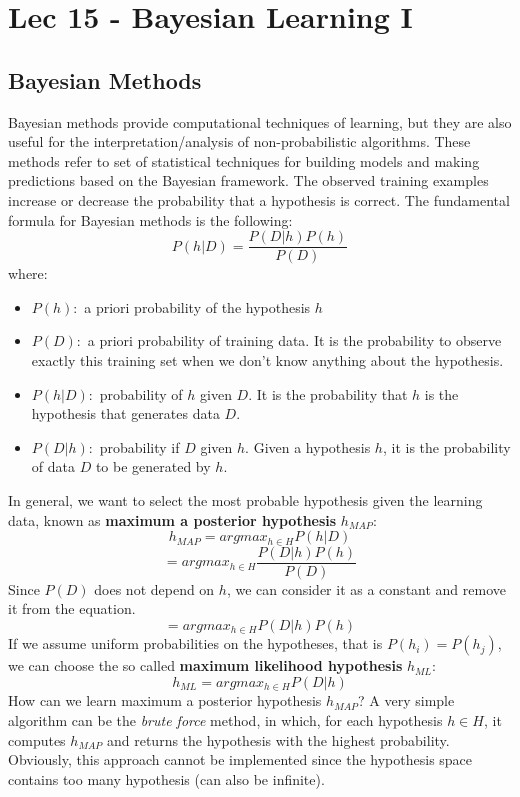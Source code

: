 \chapter{Lec 15 - Bayesian Learning I}

\section{Bayesian Methods}
Bayesian methods provide computational techniques of learning, but they are also useful for the interpretation/analysis of non-probabilistic algorithms.\newline\newline
These methods refer to set of statistical techniques for building models and making predictions based on the Bayesian framework. The observed training examples increase or decrease the probability that a hypothesis is correct.\newline\newline
The fundamental formula for Bayesian methods is the following:
\[P(h|D) = \frac{P(D|h)P(h)}{P(D)}\]
where:
\begin{itemize}
    \item $P(h):$ a priori probability of the hypothesis $h$
    \item $P(D):$ a priori probability of training data. It is the probability to observe exactly this training set when we don't know anything about the hypothesis.
    \item $P(h|D):$ probability of $h$ given $D$. It is the probability that $h$ is the hypothesis that generates data $D$.
    \item $P(D|h):$ probability if $D$ given $h$. Given a hypothesis $h$, it is the probability of data $D$ to be generated by $h$.
\end{itemize}
In general, we want to select the most probable hypothesis given the learning data, known as \textbf{maximum a posterior hypothesis} $h_{MAP}:$
\[h_{MAP} = argmax_{h \in H}P(h|D)\]
\[= argmax_{h \in H}\frac{P(D|h)P(h)}{P(D)}\]
Since $P(D)$ does not depend on $h$, we can consider it as a constant and remove it from the equation.
\[= argmax_{h \in H}P(D|h)P(h)\]
If we assume uniform probabilities on the hypotheses, that is $P(h_{i}) = P(h_{j})$, we can choose the so called \textbf{maximum likelihood hypothesis} $h_{ML}:$
\[h_{ML} = argmax_{h \in H}P(D|h)\]
How can we learn maximum a posterior hypothesis $h_{MAP}$? A very simple algorithm can be the \textit{brute force} method, in which, for each hypothesis $h \in H$, it computes $h_{MAP}$ and returns the hypothesis with the highest probability. Obviously, this approach cannot be implemented since the hypothesis space contains too many hypothesis (can also be infinite).

